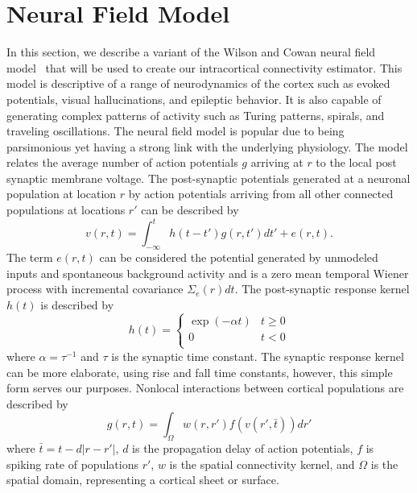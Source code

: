 \documentclass[onecolumn,draftcls]{IEEEtran}
\begin{document}
\section{Neural Field Model}
In this section, we describe a variant of the  Wilson and Cowan neural field model~\cite{Wilson1973} that will be used to create our intracortical connectivity estimator. This model is descriptive of a range of neurodynamics of the cortex such as evoked potentials, visual hallucinations, and epileptic behavior. It is also capable of generating complex patterns of activity such as Turing patterns, spirals, and traveling oscillations. The neural field model is popular due to being parsimonious yet having a strong link with the underlying physiology.
The model relates the average number of action potentials $g$ arriving at $r$ to the local post synaptic membrane voltage. The post-synaptic potentials generated at a neuronal population at location $r$ by action potentials arriving from all other connected populations at locations $r'$ can be described by
\begin{equation}\label{SpikesToPotential}
v\left( {r,t} \right) = \int_{ - \infty }^t {h\left( {t - t'} \right)g\left( {r,t'} \right)dt'} + e\left( {r,t} \right).
\end{equation}
The term $e(r,t)$ can be considered the potential generated by unmodeled inputs and spontaneous background activity and is a zero mean temporal Wiener process with incremental covariance $\Sigma_e(r)dt$. The post-synaptic response kernel $h(t)$ is described by
\begin{equation}\label{SynapticRespKernel}
h(t) = \left\{ {\begin{array}{*{20}{c}}
   {\exp ( - \alpha t)} & {t \ge 0}  \\
   0 & {t < 0}  \\
\end{array}} \right.
\end{equation}
where $\alpha=\tau^{-1}$ and $\tau$ is the synaptic time constant. The synaptic response kernel can be more elaborate, using rise and fall time constants, however, this simple form serves our purposes. Nonlocal interactions between cortical populations are described by	
\begin{equation}\label{RateBasedInteractions}
g\left( r,t \right) = \int_\Omega  {w\left( r,r' \right)f\left( v\left( r',\bar t \right) \right)dr'}
\end{equation}
where $\bar t = t - d\left| {r - r'} \right|$, $d$ is the propagation delay of action potentials, $f$ is spiking rate of populations $r'$, $w$ is the spatial connectivity kernel, and $\Omega$ is the spatial domain, representing a cortical sheet or surface.
\end{document}
